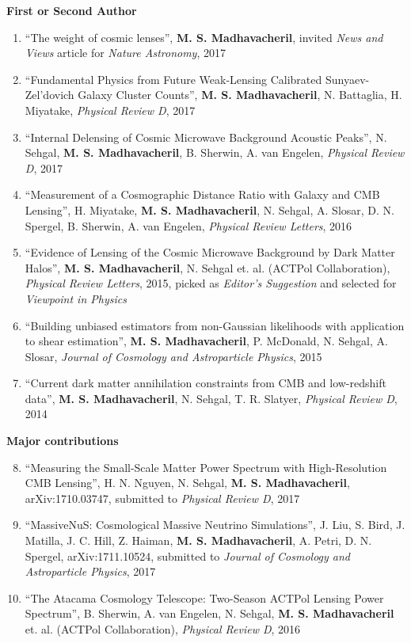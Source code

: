 \documentclass[10pt,margin]{res}
\begin{document}
\begin{resume}
\textbf{First or Second Author}
\\
\begin{enumerate}
 \item ``The weight of cosmic lenses'', {\bf M. S. Madhavacheril}, invited {\sl News and Views} article for  {\sl Nature Astronomy}, 2017
\item ``Fundamental Physics from Future Weak-Lensing Calibrated Sunyaev-Zel'dovich Galaxy Cluster Counts'', {\bf M. S. Madhavacheril}, N. Battaglia, H. Miyatake, {\sl Physical Review D}, 2017
\item ``Internal Delensing of Cosmic Microwave Background Acoustic Peaks'', N. Sehgal, {\bf M. S. Madhavacheril}, B. Sherwin, A. van Engelen, {\sl Physical Review D}, 2017
\item ``Measurement of a Cosmographic Distance Ratio with Galaxy and CMB Lensing'', H. Miyatake, {\bf M. S. Madhavacheril}, N. Sehgal, A. Slosar, D. N. Spergel, B. Sherwin, A. van Engelen, {\sl Physical Review Letters}, 2016
\item ``Evidence of Lensing of the Cosmic Microwave Background by Dark Matter Halos'', {\bf M. S. Madhavacheril}, N. Sehgal et. al. (ACTPol Collaboration), {\sl Physical Review Letters}, 2015, picked as {\sl Editor's Suggestion} and selected for {\sl Viewpoint in Physics}
\item ``Building unbiased estimators from non-Gaussian likelihoods with application to shear estimation'', {\bf M. S. Madhavacheril}, P. McDonald, N. Sehgal, A. Slosar, {\sl Journal of Cosmology and Astroparticle Physics}, 2015
\item ``Current dark matter annihilation constraints from CMB and low-redshift data'', {\bf M. S. Madhavacheril}, N. Sehgal, T. R. Slatyer, {\sl Physical Review D}, 2014
\end{enumerate}
\textbf{Major contributions}
\\
\begin{enumerate}
\setcounter{enumi}{7}
\item ``Measuring the Small-Scale Matter Power Spectrum with High-Resolution CMB Lensing'', H. N. Nguyen, N. Sehgal, {\bf M. S. Madhavacheril}, arXiv:1710.03747, submitted to {\sl Physical Review D}, 2017
\item ``MassiveNuS: Cosmological Massive Neutrino Simulations'', J. Liu, S. Bird, J. Matilla, J. C. Hill, Z. Haiman, {\bf M. S. Madhavacheril}, A. Petri, D. N. Spergel, arXiv:1711.10524, submitted to {\sl Journal of Cosmology and Astroparticle Physics}, 2017
\item ``The Atacama Cosmology Telescope: Two-Season ACTPol Lensing Power Spectrum'', B. Sherwin, A. van Engelen, N. Sehgal, {\bf M. S. Madhavacheril} et. al. (ACTPol Collaboration), {\sl Physical Review D}, 2016

\end{enumerate}
\end{resume}
\end{document}
